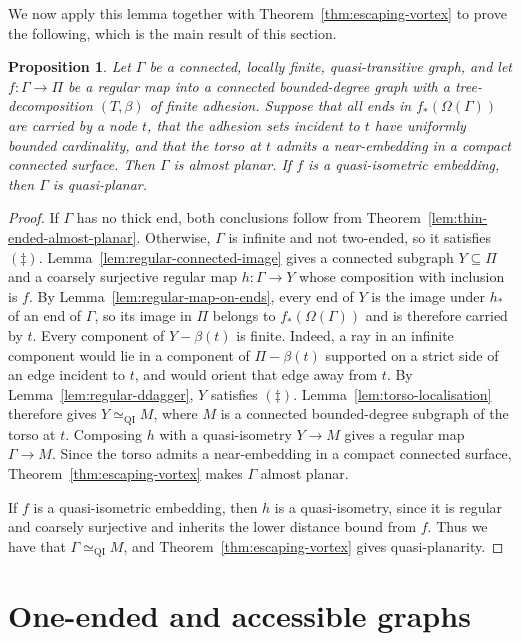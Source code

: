 \documentclass[10pt,a4paper]{amsart}
\newtheorem{proposition}[theorem]{Proposition}
\theoremstyle{definition}
\begin{document}
We now apply this lemma together with Theorem~\ref{thm:escaping-vortex} to prove the following, which is the main result of this section. 

\begin{proposition}\label{prop:end-localisation}
Let $\Gamma$ be a connected, locally finite, quasi-transitive graph, and let $f:\Gamma\to\Pi$ be a regular map into a connected bounded-degree graph with a tree-decomposition $(T,\beta)$ of finite adhesion.
Suppose that all ends in $f_*(\Omega(\Gamma))$ are carried by a node $t$, that the adhesion sets incident to $t$ have uniformly bounded cardinality, and that the torso at $t$ admits a near-embedding in a compact connected surface.
Then $\Gamma$ is almost planar.
If $f$ is a quasi-isometric embedding, then $\Gamma$ is quasi-planar.
\end{proposition}

\begin{proof}
If $\Gamma$ has no thick end, both conclusions follow from Theorem~\ref{lem:thin-ended-almost-planar}.
Otherwise, $\Gamma$ is infinite and not two-ended, so it satisfies $(\ddagger)$.
Lemma~\ref{lem:regular-connected-image} gives a connected subgraph $Y\subseteq\Pi$ and a coarsely surjective regular map $h:\Gamma\to Y$ whose composition with inclusion is $f$.
By Lemma~\ref{lem:regular-map-on-ends}, every end of $Y$ is the image under $h_*$ of an end of $\Gamma$, so its image in $\Pi$ belongs to $f_*(\Omega(\Gamma))$ and is therefore carried by $t$.
Every component of $Y-\beta(t)$ is finite.
Indeed, a ray in an infinite component would lie in a component of $\Pi-\beta(t)$ supported on a strict side of an edge incident to $t$, and would orient that edge away from $t$.
By Lemma~\ref{lem:regular-ddagger}, $Y$ satisfies $(\ddagger)$.
Lemma~\ref{lem:torso-localisation} therefore gives $Y\simeq_{\mathrm{QI}}M$, where $M$ is a connected bounded-degree subgraph of the torso at $t$. 
Composing $h$ with a quasi-isometry $Y\to M$ gives a regular map $\Gamma\to M$. 
Since the torso admits a near-embedding in a compact connected surface, Theorem~\ref{thm:escaping-vortex} makes $\Gamma$ almost planar.

If $f$ is a quasi-isometric embedding, then $h$ is a quasi-isometry, since it is regular and coarsely surjective and inherits the lower distance bound from $f$. Thus we have that $\Gamma\simeq_{\mathrm{QI}}M$, and Theorem~\ref{thm:escaping-vortex} gives quasi-planarity.
\end{proof}


\section{One-ended and accessible graphs}\label{sec:one-ended-case}
\end{document}
